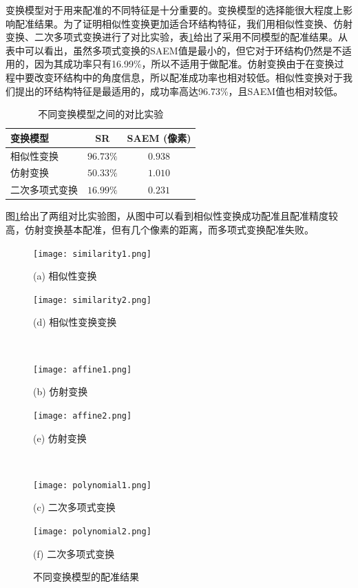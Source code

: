 变换模型对于用来配准的不同特征是十分重要的。变换模型的选择能很大程度上影响配准结果。为了证明相似性变换更加适合环结构特征，我们用相似性变换、仿射变换、二次多项式变换进行了对比实验，表\ref{tab:models}给出了采用不同模型的配准结果。从表中可以看出，虽然多项式变换的SAEM值是最小的，但它对于环结构仍然是不适用的，因为其成功率只有16.99\%，所以不适用于做配准。仿射变换由于在变换过程中要改变环结构中的角度信息，所以配准成功率也相对较低。相似性变换对于我们提出的环结构特征是最适用的，成功率高达96.73\%，且SAEM值也相对较低。
\begin{table}[!ht]
\caption{不同变换模型之间的对比实验}
\centering
\begin{tabular}{lcc}
\toprule
变换模型 & SR  & SAEM (像素)\\
\midrule
相似性变换 & $\mathbf{96.73\%}$ & $\mathbf{0.938}$ \\
仿射变换 & $50.33\%$ & $1.010$              \\
二次多项式变换 & $16.99\%$ & $0.231$\\
\bottomrule
\end{tabular}
\label{tab:models}
\end{table}

图\ref{fig:transform-fig}给出了两组对比实验图，从图中可以看到相似性变换成功配准且配准精度较高，仿射变换基本配准，但有几个像素的距离，而多项式变换配准失败。
\begin{figure}[!ht]
\centering

\begin{minipage}[b]{0.48\textwidth} 
      \centering 
      \texttt{[image: similarity1.png]}
        \centerline{(a) 相似性变换}\medskip
\end{minipage}
  \begin{minipage}[b]{0.48\textwidth}
    \centering
    \texttt{[image: similarity2.png]}
      \centerline{(d) 相似性变换变换}\medskip
  \end{minipage}
\\
  \begin{minipage}[b]{0.48\textwidth}
    \centering
    \texttt{[image: affine1.png]}
      \centerline{(b) 仿射变换}\medskip
  \end{minipage}
 \begin{minipage}[b]{0.48\textwidth}
    \centering
      \texttt{[image: affine2.png]}
        \centerline{(e) 仿射变换}\medskip
    \end{minipage}
\\
\begin{minipage}[b]{0.48\textwidth}
	\centering
      \texttt{[image: polynomial1.png]}
        \centerline{(c) 二次多项式变换}\medskip
    \end{minipage}
  \begin{minipage}[b]{0.48\textwidth}
    \centering
    \texttt{[image: polynomial2.png]}
      \centerline{(f) 二次多项式变换}\medskip
  \end{minipage}
\caption{不同变换模型的配准结果}
\label{fig:transform-fig}
\end{figure}


